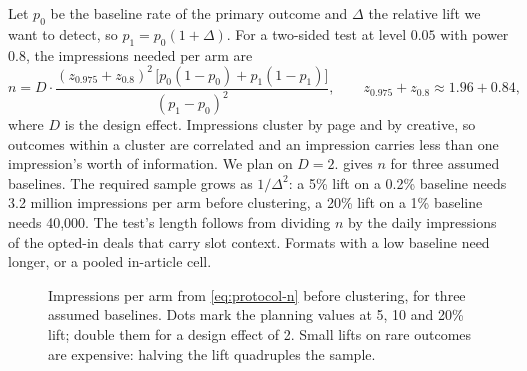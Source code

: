 Let $p_0$ be the baseline rate of the primary outcome and $\Delta$ the relative lift we want to detect, so $p_1 = p_0(1 + \Delta)$. For a two-sided test at level $0.05$ with power $0.8$, the impressions needed per arm are
\begin{equation}\label{eq:protocol-n}
  n = D \cdot \frac{(z_{0.975} + z_{0.8})^2\,\bigl[p_0(1-p_0) + p_1(1-p_1)\bigr]}{(p_1 - p_0)^2},
  \qquad z_{0.975} + z_{0.8} \approx 1.96 + 0.84,
\end{equation}
where $D$ is the design effect. Impressions cluster by page and by creative, so outcomes within a cluster are correlated and an impression carries less than one impression's worth of information. We plan on $D = 2$.  gives $n$ for three assumed baselines. The required sample grows as $1/\Delta^2$: a 5\% lift on a 0.2\% baseline needs 3.2 million impressions per arm before clustering, a 20\% lift on a 1\% baseline needs 40,000. The test's length follows from dividing $n$ by the daily impressions of the opted-in deals that carry slot context. Formats with a low baseline need longer, or a pooled in-article cell.

\begin{figure}[t]
\centering
{}
\caption{Impressions per arm from \cref{eq:protocol-n} before clustering, for three assumed baselines. Dots mark the planning values at 5, 10 and 20\% lift; double them for a design effect of 2. Small lifts on rare outcomes are expensive: halving the lift quadruples the sample.}
\label{fig:protocol-power}
\end{figure}

